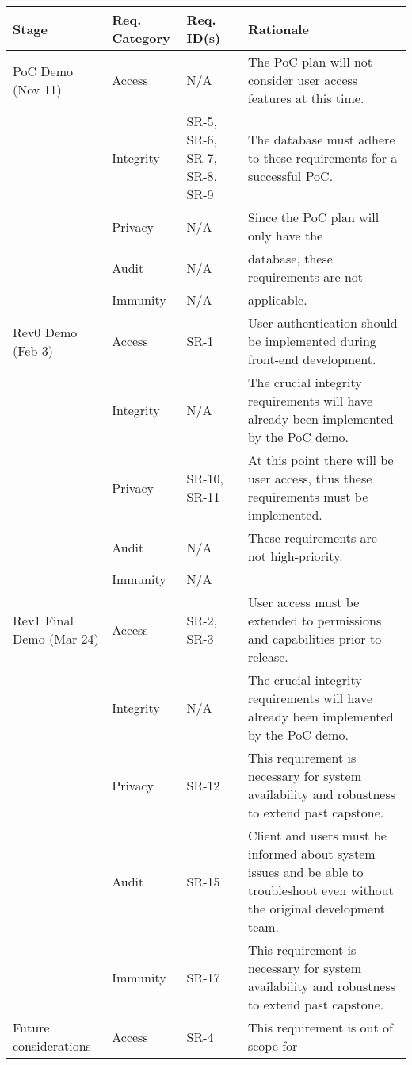 \documentclass{article}
\begin{document}
\begin{longtable}[c]{|m{2cm}|m{2.6cm}|m{2.6cm}|m{5.8cm}|}
    \hline
    \textbf{Stage} & \textbf{Req. Category} & \textbf{Req. ID(s)} &
    \textbf{Rationale} \\
    \hline
    \endhead
    PoC Demo (Nov 11) & Access & N/A & The PoC plan will not consider user
    access features at this time.\\
    \cline{2-4}
    & Integrity & SR-5, SR-6, SR-7, SR-8, SR-9 & The database must adhere to
    these requirements for a successful PoC.\\
    \cline{2-4}
    & Privacy & N/A & Since the PoC plan will only have the\\
    & Audit & N/A & database, these requirements are not\\
    & Immunity & N/A & applicable.\\
    \hline
    Rev0 Demo (Feb 3) & Access & SR-1 & User authentication should be
    implemented during front-end development.\\
    \cline{2-4}
    & Integrity & N/A & The crucial integrity requirements will have already
    been implemented by the PoC demo.\\
    \cline{2-4}
    & Privacy & SR-10, SR-11 & At this point there will be user access, thus
    these requirements must be implemented.\\
    \cline{2-4}
    & Audit & N/A & These requirements are not high-priority.\\
    & Immunity & N/A & \\
    \hline
    Rev1 Final Demo (Mar 24) & Access & SR-2, SR-3 & User access must be
    extended to permissions and capabilities prior to release.\\
    \cline{2-4}
    & Integrity & N/A & The crucial integrity requirements will have already
    been implemented by the PoC demo.\\
    \cline{2-4}
    & Privacy & SR-12 & This requirement is necessary for system availability
    and robustness to extend past capstone.\\
    \hline
    \cline{2-4}
    & Audit & SR-15 & Client and users must be informed about system issues and
    be able to troubleshoot even without the original development team.\\
    \cline{2-4}
    & Immunity & SR-17 & This requirement is necessary for system availability
    and robustness to extend past capstone.\\
    \hline
    Future considerations & Access & SR-4 & This requirement is out of scope for

\end{longtable}
\end{document}
